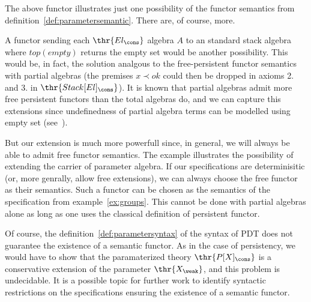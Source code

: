 %
The above functor illustrates just one possibility of the functor semantics
from definition~\ref{def:parametersemantic}. There are, of course, more.

A functor sending each
$\thr{El_\cons}$ algebra $A$ to an standard stack algebra where $top(empty)$
returns the empty set would be another possibility. This would be, in fact,
the solution analgous to the free-persistent functor semantics with partial
algebras (the premises $x\prec ok$ could then be dropped in axioms 2. and
3. in $\thr{Stack[El]_\cons}$). It is known that partial algebras admit more free persistent functors
than the total algebras do, and we can capture this extensions since
undefinedness of partial algebra terms can be modelled using empty set
(see~\cite{partial}). 

But our extension is much more powerfull since, in general, we will always be
able to admit free functor semantics. The example illustrates the possibility
of extending the carrier of parameter algebra. If our specifications are determinisitic (or, more
genrally, allow free extensions), we can always choose the free functor as
their semantics. Such a functor can be chosen as the semantics of the
specification from example~\ref{ex:groups}. This cannot be done with partial
algebras alone as long as one uses the classical definition of persistent functor.

Of course, the definition~\ref{def:parametersyntax} of the syntax of PDT does not guarantee the existence of a semantic
functor. As in the case of persistency, we would have to show that the
paramaterized theory $\thr{P[X]_\cons}$ is a conservative extension of the
parameter $\thr{X_\weak}$, and this problem is undecidable. It is a possible
topic for further work to identify syntactic restrictions on the
specifications ensuring the existence of a semantic functor.

